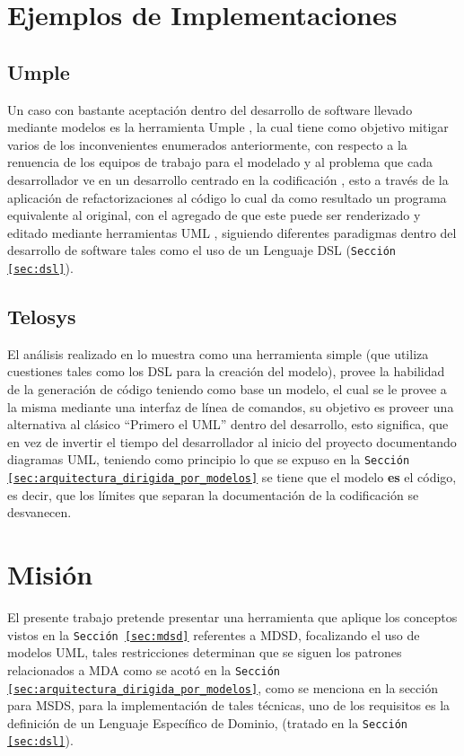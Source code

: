 \section{Ejemplos de Implementaciones}

\subsection{Umple}
Un caso con bastante aceptación dentro del desarrollo de software llevado
mediante modelos es la herramienta Umple {\cite{umple-official}}, la cual tiene
como objetivo mitigar varios de los inconvenientes enumerados anteriormente, con
respecto a la renuencia de los equipos de trabajo para el modelado y al
problema que cada desarrollador ve en un desarrollo centrado en la
codificación \cites{aldaeej2016}{garzon2014}, esto a través de la aplicación de
refactorizaciones al código lo cual da como resultado un programa equivalente
al original, con el agregado de que este puede ser renderizado y editado
mediante herramientas UML \cite{lethbridge2010}, siguiendo diferentes
paradigmas dentro del desarrollo de software tales como el uso de un Lenguaje
DSL (\texttt{Sección \ref{sec:dsl}}).

\subsection{Telosys}
El análisis realizado en \cite{telosys} lo muestra como una herramienta simple
(que utiliza cuestiones tales como los DSL para la creación del modelo),
provee la habilidad de la generación de código teniendo como base un modelo,
el cual se le provee a la misma mediante una interfaz de línea de comandos, su
objetivo es proveer una alternativa al clásico ``Primero el UML'' dentro del
desarrollo, esto significa, que en vez de invertir el tiempo del
desarrollador al inicio del proyecto documentando diagramas UML, teniendo como
principio lo que se expuso en la \texttt{Sección
\ref{sec:arquitectura_dirigida_por_modelos}} se
tiene que el modelo \textbf{es} el código, es decir, que los límites que separan
la documentación de la codificación se desvanecen.

\section{Misión}
\label{sec:problema}
El presente trabajo pretende presentar una herramienta que aplique los
conceptos vistos en la \texttt{Sección \ref{sec:mdsd}} referentes a MDSD,
focalizando el uso de modelos UML, tales restricciones determinan que se siguen
los patrones relacionados a MDA como se acotó en la
\texttt{Sección \ref{sec:arquitectura_dirigida_por_modelos}}, como se menciona
en la sección para MSDS, para la implementación de tales técnicas, uno de los
requisitos es la definición de un Lenguaje Específico de Dominio, (tratado en
la \texttt{Sección \ref{sec:dsl}}).

